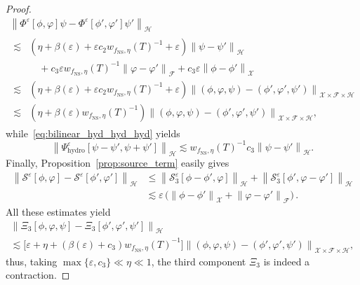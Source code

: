 \documentclass[AHL,Unicode,longabstracts,published]{cedram}
\newcommand{\ns}{\mathrm{NS}}
\newcommand{\hyd}{\mathrm{hydro}}
\renewcommand{\SS}{\mathcal{S}}
\newcommand{\FFF}{\mathscr{F}}
\newcommand{\HHH}{\mathscr{H}}
\newcommand{\GGG}{\mathscr{X}}
\newcommand{\SSSs}{\HHH}
\newcommand{\SSSl}{\GGG}
\newcommand{\SSSm}{\FFF}
\renewcommand*\leq{\leqslant}
\newcommand*\eps{{\varepsilon}}
\begin{document}
\begin{proof}
\begin{multline*}
\left\| \Phi^\eps\left[\phi, \varphi\right] \psi - \Phi^\eps\left[\phi', \varphi'\right] \psi' \right\|_{ \SSSs } \\
\begin{aligned}
\lesssim & \left(\eta + \beta(\eps) + \eps c_2 w_{ f_\ns, \eta }(T)^{-1} + \eps\right) \left\| \psi - \psi' \right\|_{ \SSSs } \\
&\quad + c_3 \eps w_{ f_\ns, \eta }(T)^{-1} \left\| \varphi - \varphi' \right\|_{ \SSSm } + c_3 \eps \left\| \phi - \phi' \right\|_{ \SSSl } \\
\lesssim & \left(\eta + \beta(\eps) + \eps c_2 w_{ f_\ns, \eta }(T)^{-1} + \eps \right) \left\| (\phi, \varphi, \psi) - \left(\phi', \varphi', \psi'\right) \right\|_{ \SSSl \times \SSSm \times \SSSs } \\
\lesssim & \left(\eta + \beta(\eps) w_{ f_\ns, \eta }(T)^{-1} \right) \left\| (\phi, \varphi, \psi) - \left(\phi', \varphi', \psi'\right) \right\|_{ \SSSl \times \SSSm \times \SSSs },
\end{aligned}
\end{multline*}
while~\eqref{eq:bilinear_hyd_hyd_hyd} yields
\[
\left\| \Psi^\eps_\hyd\left[\psi - \psi', \psi + \psi'\right] \right\|_{ \SSSs } \lesssim w_{f_\ns, \eta}(T)^{-1} c_3 \left\| \psi - \psi' \right\|_{ \SSSs }.
\]
Finally, Proposition~\ref{prop:source_term} easily gives
\begin{align*}
\left\| \SS^\eps[\phi,\varphi] -\SS^\eps\left[\phi',\varphi'\right]\right\|_{\SSSs} & \leq \left\| \SS_3^\eps\left[\phi-\phi',\varphi\right]\right\|_{\SSSs} + \left\| \SS_3^\eps\left[\phi',\varphi-\varphi'\right]\right\|_{\SSSs} \\
& \lesssim \eps\,\bigg(\left\| \phi-\phi'\right\|_{\SSSl} + \left\| \varphi-\varphi'\right\|_{\SSSm}\bigg)\,.
\end{align*}
All these estimates yield
\begin{multline*}
\left\| \Xi_3\left[\phi, \varphi, \psi\right]  - \Xi_3\left[\phi', \varphi', \psi'\right] \right\|_{ \SSSs } \\
 \lesssim \Big[{\eps +} \eta + \left(\beta(\eps) + c_3 \right) w_{ f_\ns, \eta }(T)^{-1} \Big] \left\| \left(\phi, \varphi, \psi\right) - \left(\phi', \varphi', \psi'\right) \right\|_{ \SSSl \times \SSSm \times \SSSs },
\end{multline*}
thus, taking $\max\{ \eps, c_3 \} \ll \eta \ll 1$, the third component $\Xi_3$ is indeed a contraction.
\end{proof}
\end{document}
